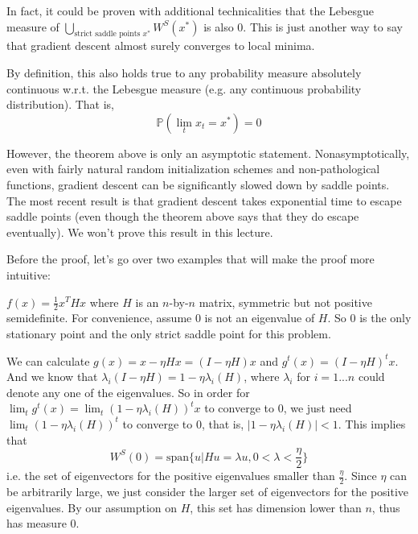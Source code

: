 \begin{remark}
In fact, it could be proven with additional technicalities that the Lebesgue measure of 
$
\bigcup_{\text{strict saddle points }x^*} W^S(x^*)
$
is also 0. This is just another way to say that gradient descent almost surely converges to local minima. 
\end{remark}

\begin{remark}
By definition, this also holds true to any probability measure absolutely continuous w.r.t. the Lebesgue measure (e.g. any continuous probability distribution). That is,
$$\mathbb{P}(\lim_t x_t = x^*) = 0$$
\end{remark}

However, the theorem above is only an asymptotic statement. Nonasymptotically, even with fairly natural random initialization schemes and non-pathological functions, gradient descent can be significantly slowed down by saddle points. 
The most recent result \cite{du2017gradient} is that gradient descent takes exponential time to escape saddle points (even though the theorem above says that they do escape eventually). We won't prove this result in this lecture.

Before the proof, let's go over two examples that will make the proof more intuitive:

\begin{example}
$f(x) = \frac{1}{2} x^THx$ where $H$ is an $n$-by-$n$ matrix, symmetric but not positive semidefinite. 
For convenience, assume $0$ is not an eigenvalue of $H$.
So $0$ is the only stationary point and the only strict saddle point for this problem.

We can calculate
$g(x) = x - \eta Hx = (I-\eta H)x$ and 
$g^t(x) = (I-\eta H)^tx$. 
And we know that 
$\lambda_i(I - \eta H) = 
1-\eta \lambda_i(H)$, where $\lambda_i$ for $i=1...n$ could denote any one of the eigenvalues.
So in order for $\lim_t g^t(x) = \lim_t (1-\eta \lambda_i(H))^t x$ to converge to 0, we just need $\lim_t (1-\eta \lambda_i(H))^t$ to converge to 0, that is, $|1-\eta \lambda_i(H)| < 1$. This implies that
$$W^S(0) = \text{span}\bigg\{ u| Hu=\lambda u,  0< \lambda < \frac{\eta}{2} \bigg\}$$
i.e. the set of eigenvectors for the positive eigenvalues smaller than 
$\frac{\eta}{2}$. Since $\eta$ can be arbitrarily large, we just consider the larger set of eigenvectors for the positive eigenvalues. By our assumption on $H$, this set has dimension lower than $n$, thus has measure 0.
\end{example}

